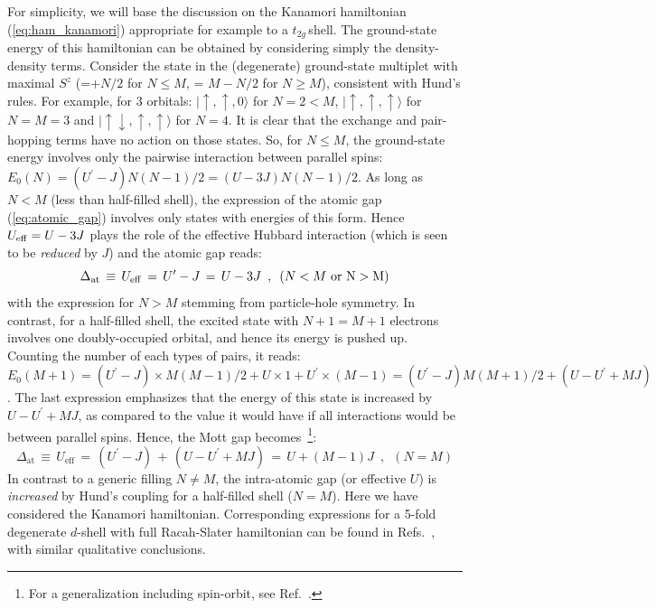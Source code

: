 \documentclass[]{ar2e-changed}%
\def\Gapat{\Delta_{\mathrm{at}}}
\def\Up{U^\prime}
\def\Ueff{U_{\mathrm{eff}}}
\def\spinup{\uparrow}
\def\spindown{\downarrow}
\def\ket{\rangle}
\def\ttg{$t_{2g}\,$}
\begin{document}
For simplicity, we will base the discussion on the Kanamori hamiltonian (\ref{eq:ham_kanamori}) 
appropriate for example to a \ttg shell.  The ground-state energy of this hamiltonian 
can be obtained by considering simply the density-density terms. Consider the state in the (degenerate) 
ground-state multiplet with maximal $S^z$ (=$+N/2$ for $N\leq M$, = $M-N/2$ for $N\geq M$), 
consistent with Hund's rules.
For example, for 3 orbitals: $|\spinup,\spinup,0\ket$ for $N=2<M$, 
$|\spinup,\spinup,\spinup\ket$ for $N=M=3$ and $|\spinup\spindown,\spinup,\spinup\ket$ for $N=4$.
% 
It is clear that the exchange and pair-hopping terms have no action on those states. So, for $N\leq M$, the ground-state 
energy involves only the pairwise interaction between parallel spins: $E_0(N)=(\Up-J)N(N-1)/2=(U-3J)N(N-1)/2$. As long as 
$N<M$ (less than half-filled shell), the expression of the atomic gap (\ref{eq:atomic_gap}) involves only states with 
energies of this form. Hence $U_{\rm{eff}}=U-3J$ plays the role of the effective Hubbard interaction (which is seen to 
be {\it reduced} by $J$) and the atomic gap reads:
\begin{equation}
\Gapat\,\equiv\,\Ueff\,=\,\Up-J\,=\,U-3J\,\,\,,\,\,\,(N<M\,\,\rm{or}\,\, N>M)
\label{eq:atomic_gap_non_half_filled}
\end{equation}
with the expression for $N>M$ stemming from particle-hole symmetry. In contrast, for a half-filled shell, the excited state 
with $N+1=M+1$ electrons involves one doubly-occupied orbital, and hence its energy is pushed up. 
Counting the number of each types of pairs, it reads: 
$E_0(M+1)=(\Up-J)\times M(M-1)/2 + U\times 1 + \Up\times (M-1)=(\Up-J)M(M+1)/2+(U-\Up+MJ)$. The last expression emphasizes that 
the energy of this state is increased by $U-\Up+MJ$, as compared to the value it would have if all interactions would be between parallel 
spins. Hence, the Mott gap becomes~\footnote{For a generalization including spin-orbit, see Ref.~\cite{meetei_doublepero_2012}.}: 
 \begin{equation}
 \Gapat\,\equiv\,\Ueff\,=\,
 (\Up-J)\,+\,(U-\Up+MJ)\,=\,U+(M-1)J\,\,\,,\,\,\,(N=M)
 \label{eq:atomic_gap_half_filled}
 \end{equation}
 In contrast to a generic filling $N\neq M$, the intra-atomic gap (or effective $U$) is {\it increased} 
 by Hund's coupling for a half-filled shell ($N=M$).  
 Here we have considered the Kanamori hamiltonian. Corresponding expressions for a 5-fold degenerate $d$-shell 
 with full Racah-Slater hamiltonian can be found 
 in Refs.~\cite{vandermarel_sawatzky_prb_1988,vandermarel_phd_1985,haverkort_phd_2005}, 
 with similar qualitative conclusions. 
 
\end{document}
